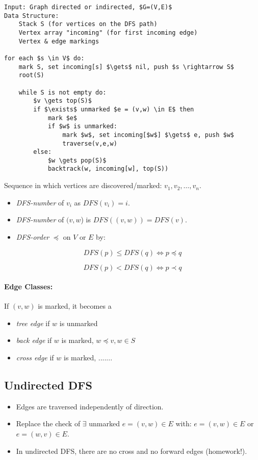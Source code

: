 \begin{lstlisting}[mathescape]
Input: Graph directed or indirected, $G=(V,E)$
Data Structure:
    Stack S (for vertices on the DFS path)
    Vertex array "incoming" (for first incoming edge)
    Vertex & edge markings

for each $s \in V$ do:
    mark S, set incoming[s] $\gets$ nil, push $s \rightarrow S$
    root(S)
    
    while S is not empty do:
        $v \gets top(S)$
        if $\exists$ unmarked $e = (v,w) \in E$ then
            mark $e$
            if $w$ is unmarked:
                mark $w$, set incoming[$w$] $\gets$ e, push $w$
                traverse(v,e,w)
        else:
            $w \gets pop(S)$
            backtrack(w, incoming[w], top(S))
\end{lstlisting}

Sequence in which vertices are discovered/marked: $v_1, v_2, \ldots, v_n$.
\begin{itemize}
\item \emph{DFS-number} of $v_i$ as $DFS(v_i) = i$.
\item \emph{DFS-number} of $(v,w$) is $DFS((v,w)) = DFS(v)$.
\item \emph{DFS-order} $\preceq$ on $V$ or $E$ by:
\end{itemize}

$$DFS(p) \le DFS(q) \iff p \preceq q$$

$$DFS(p) < DFS(q) \iff p \prec q$$

\paragraph{Edge Classes: } If $(v,w)$ is marked, it becomes a
\begin{itemize}
\item \emph{tree edge} if $w$ is unmarked
\item \emph{back edge} if $w$ is marked, $w \preceq v, w \in S$
\item \emph{cross edge} if $w$ is marked, .......
\end{itemize}

\subsection{Undirected DFS}

\begin{itemize}
\item Edges are traversed independently of direction.
\item Replace the check of $\exists$ unmarked $e=(v,w) \in E$ with: $e=(v,w) \in E$ or $e=(w,v) \in E$.
\item In undirected DFS, there are no cross and no forward edges (homework!).
\end{itemize}

